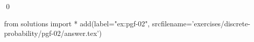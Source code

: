 
\begin{ex} 
  \label{ex:pgf-02}
  
  \qed
\end{ex} 
\begin{python0}
from solutions import *
add(label="ex:pgf-02",
    srcfilename='exercises/discrete-probability/pgf-02/answer.tex') 
\end{python0}
